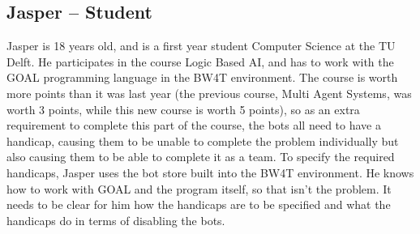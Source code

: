 \subsection{Jasper – Student}
Jasper is 18 years old, and is a first year student Computer Science at the TU Delft. He participates in the course Logic Based AI, and has to work with the GOAL programming language in the BW4T environment. The course is worth more points than it was last year (the previous course, Multi Agent Systems, was worth 3 points, while this new course is worth 5 points), so as an extra requirement to complete this part of the course, the bots all need to have a handicap, causing them to be unable to complete the problem individually but also causing them to be able to complete it as a team. To specify the required handicaps, Jasper uses the bot store built into the BW4T environment. 
He knows how to work with GOAL and the program itself, so that isn’t the problem. It needs to be clear for him how the handicaps are to be specified and what the handicaps do in terms of disabling the bots.
